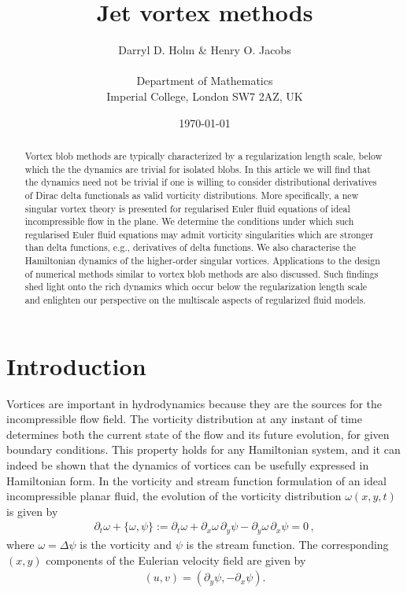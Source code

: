 \documentclass[12pt]{amsart}
\title{Jet vortex methods}
\author[D.D. Holm \& H.O. Jacobs]{Darryl D. Holm \& Henry O. Jacobs\\ \\
Department of Mathematics\\
Imperial College, London SW7 2AZ, UK}
\date{\today}
\theoremstyle{remark}
\begin{document}
\begin{abstract}
Vortex blob methods are typically characterized by a regularization length scale, below which the the dynamics are trivial for isolated blobs.
In this article we will find that the dynamics need not be trivial if one is willing to consider distributional derivatives of Dirac delta functionals as valid vorticity distributions.
More specifically, a new singular vortex theory is presented for regularised Euler fluid equations of ideal incompressible flow in the plane.
We determine the conditions under which such regularised Euler fluid equations may admit vorticity singularities which are stronger than delta functions, e.g., derivatives of delta functions.
We also characterise the Hamiltonian dynamics of the higher-order singular vortices.
Applications to the design of numerical methods similar to vortex blob methods are also discussed.
Such findings shed light onto the rich dynamics which occur below the regularization length scale and
enlighten our perspective on the multiscale aspects of regularized fluid models.
\end{abstract}

\maketitle

\section{Introduction}
\label{sec:intro}
Vortices are important in hydrodynamics because they are the sources for the incompressible flow field. The vorticity distribution at any instant of time determines both the current state of the flow and its future evolution, for given boundary conditions. This property holds for any Hamiltonian system, and it can indeed be shown that the dynamics of vortices can be usefully expressed in Hamiltonian form. In the vorticity and stream function formulation of an ideal incompressible planar fluid, the evolution of the vorticity distribution $\omega(x,y,t)$ is given by
\begin{align}
  \partial_t \omega + \{\omega,\psi\} := 
  \partial_t \omega + \partial_x  \omega\,  \partial_y \psi
  - \partial_y \omega \, \partial_x \psi = 0\,, \label{eq:vorticity}
\end{align}
where $\omega = \Delta \psi$ is the vorticity and $\psi$ is the stream function.
The corresponding $(x,y)$ components of the Eulerian velocity field are given by
\begin{align*}
	 (u,v) = (\partial_y \psi , - \partial_x \psi).
\end{align*}
\end{document}
